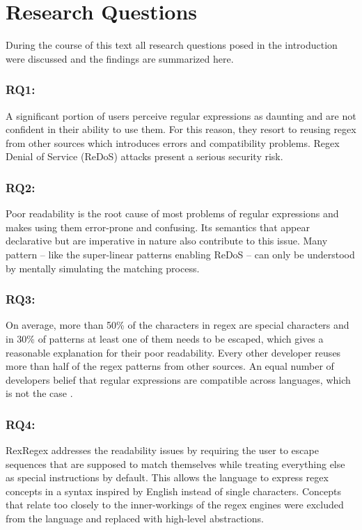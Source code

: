 \section{Research Questions}

During the course of this text all research questions posed in the introduction were discussed and the findings are summarized here.

\subsubsection{RQ1: \RQone}

A significant portion of users perceive regular expressions as daunting and are not confident in their ability to use them. For this reason, they resort to reusing regex from other sources which introduces errors and compatibility problems. Regex Denial of Service (ReDoS) attacks present a serious security risk.

\subsubsection{RQ2: \RQtwo}

Poor readability is the root cause of most problems of regular expressions and makes using them error-prone and confusing. Its semantics that appear declarative but are imperative in nature also contribute to this issue. Many pattern -- like the super-linear patterns enabling ReDoS -- can only be understood by mentally simulating the matching process. 

\subsubsection{RQ3: \RQthree}

On average, more than 50\% of the characters in regex are special characters and in 30\% of patterns at least one of them needs to be escaped, which gives a reasonable explanation for their poor readability. Every other developer reuses more than half of the regex patterns from other sources. An equal number of developers belief that regular expressions are compatible across languages, which is not the case \cite{RegexNotLinguaFranca}.

\subsubsection{RQ4: \RQfour}

RexRegex addresses the readability issues by requiring the user to escape sequences that are supposed to match themselves while treating everything else as special instructions by default. This allows the language to express regex concepts in a syntax inspired by English instead of single characters. Concepts that relate too closely to the inner-workings of the regex engines were excluded from the language and replaced with high-level abstractions.

